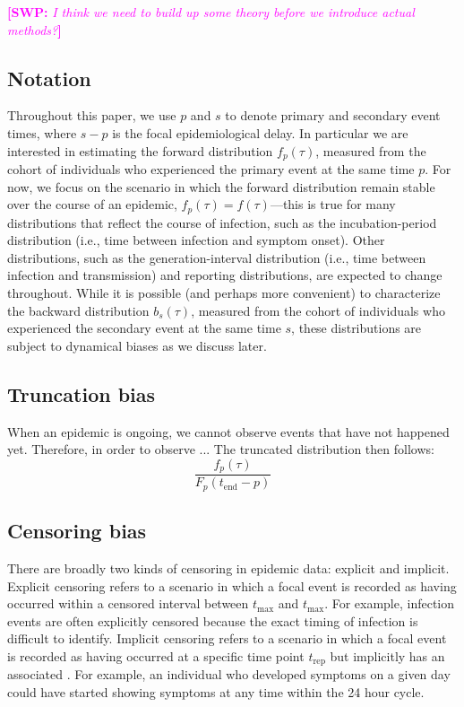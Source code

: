 \documentclass[12pt]{article}
\newcommand{\comment}{\showcomment}
\newcommand{\showcomment}[3]{\textcolor{#1}{\textbf{[#2: }\textsl{#3}\textbf{]}}}
\newcommand{\swp}[1]{\comment{magenta}{SWP}{#1}}
\newcommand{\tend}{{t_{\mathrm{end}}}}
\newcommand{\tmin}{{t_{\mathrm{max}}}}
\newcommand{\tmax}{{t_{\mathrm{max}}}}
\newcommand{\trep}{{t_{\mathrm{rep}}}}
\begin{document}
\swp{I think we need to build up some theory before we introduce actual methods?}

\subsection{Notation}

Throughout this paper, we use $p$ and $s$ to denote primary and secondary event times, where $s-p$ is the focal epidemiological delay.
In particular we are interested in estimating the forward distribution $f_p(\tau)$, measured from the cohort of individuals who experienced the primary event at the same time $p$.
For now, we focus on the scenario in which the forward distribution remain stable over the course of an epidemic, $f_p(\tau) = f(\tau)$---this is true for many distributions that reflect the course of infection, such as the incubation-period distribution (i.e., time between infection and symptom onset).
Other distributions, such as the generation-interval distribution (i.e., time between infection and transmission) and reporting distributions, are expected to change throughout.
While it is possible (and perhaps more convenient) to characterize the backward distribution $b_s(\tau)$, measured from the cohort of individuals who experienced the secondary event at the same time $s$, these distributions are subject to dynamical biases as we discuss later.

\subsection{Truncation bias}

When an epidemic is ongoing, we cannot observe events that have not happened yet.
Therefore, in order to observe ...
The truncated distribution then follows:
\begin{equation}
\frac{f_p(\tau)}{F_p(\tend-p) }
\end{equation}

\subsection{Censoring bias}

There are broadly two kinds of censoring in epidemic data: explicit and implicit.
Explicit censoring refers to a scenario in which a focal event is recorded as having occurred within a censored interval between $\tmin$ and $\tmax$.
For example, infection events are often explicitly censored because the exact timing of infection is difficult to identify.
Implicit censoring refers to a scenario in which a focal event is recorded as having occurred at a specific time point $\trep$ but implicitly has an associated .
For example, an individual who developed symptoms on a given day could have started showing symptoms at any time within the 24 hour cycle.
\end{document}
